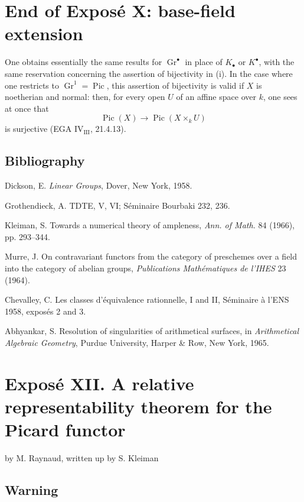 \documentclass[11pt]{article}
\newcommand{\Gr}{\operatorname{Gr}}
\providecommand{\Pic}{\operatorname{Pic}}
\providecommand{\Gr}{\operatorname{Gr}}
\providecommand{\Gr}{\operatorname{G}}
\begin{document}
\section*{End of Exposé X: base-field extension}

One obtains essentially the same results for \(\Gr^\bullet\) in place of \(K_\bullet\) or \(K^\bullet\), with the same reservation concerning the assertion of bijectivity in (i). In the case where one restricts to \(\Gr^1=\Pic\), this assertion of bijectivity is valid if \(X\) is noetherian and normal: then, for every open \(U\) of an affine space over \(k\), one sees at once that
\[
  \Pic(X)\longrightarrow \Pic(X\times_k U)
\]
is surjective (EGA \(\mathrm{IV}_{\mathrm{III}}\), 21.4.13).

\subsection*{Bibliography}
\begin{enumerate}[label={[\arabic*]}]
\item Dickson, E. \emph{Linear Groups}, Dover, New York, 1958.
\item Grothendieck, A. TDTE, V, VI; Séminaire Bourbaki 232, 236.
\item Kleiman, S. Towards a numerical theory of ampleness, \emph{Ann. of Math.} 84 (1966), pp. 293--344.
\item Murre, J. On contravariant functors from the category of preschemes over a field into the category of abelian groups, \emph{Publications Mathématiques de l'IHES} 23 (1964).
\item Chevalley, C. Les classes d'équivalence rationnelle, I and II, Séminaire à l'ENS 1958, exposés 2 and 3.
\item Abhyankar, S. Resolution of singularities of arithmetical surfaces, in \emph{Arithmetical Algebraic Geometry}, Purdue University, Harper \& Row, New York, 1965.
\end{enumerate}

\newpage
\section*{Exposé XII. A relative representability theorem for the Picard functor}
\begin{center}
by M. Raynaud, written up by S. Kleiman
\end{center}

\subsection*{Warning}
\end{document}
